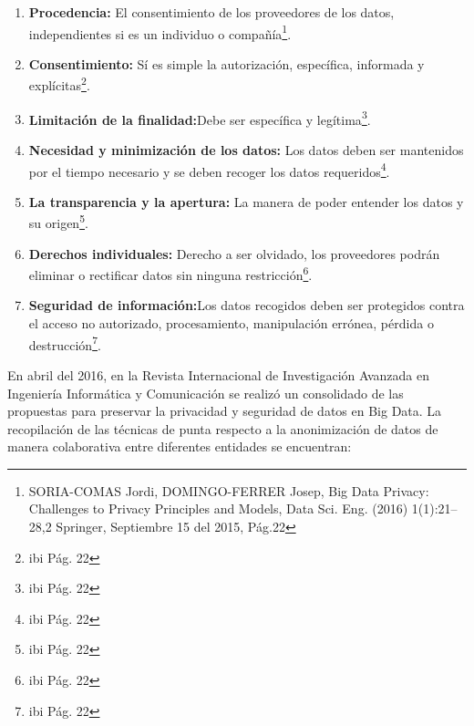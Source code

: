 \documentclass[a4paper,openright,12pt]{book}
\theoremstyle{definition}
\theoremstyle{remark}
\begin{document}
\begin{enumerate}
	\item \textbf{Procedencia:} El consentimiento de los proveedores de los datos, independientes si es un individuo o compañía\footnote{SORIA-COMAS Jordi, DOMINGO-FERRER Josep, 
Big Data Privacy: Challenges to Privacy Principles and Models, Data Sci. Eng. (2016) 1(1):21–28,2 Springer, Septiembre 15 del 2015, Pág.22}.
    \item \textbf{Consentimiento:} Sí es simple la autorización, específica, informada y explícitas\footnote{ibi Pág. 22}.
    \item \textbf{Limitación de la finalidad:}Debe ser específica y legítima\footnote{ibi Pág. 22}.
    \item \textbf{Necesidad y minimización de los datos:} Los datos deben ser mantenidos por el tiempo necesario y se deben recoger los datos requeridos\footnote{ibi Pág. 22}.
    \item \textbf{La transparencia y la apertura:} La manera de poder entender los datos y su origen\footnote{ibi Pág. 22}.
    \item \textbf{Derechos individuales:} Derecho a ser olvidado, los proveedores podrán eliminar o rectificar datos sin ninguna restricción\footnote{ibi Pág. 22}.
    \item \textbf{Seguridad de información:}Los datos recogidos deben ser protegidos contra el acceso no autorizado, procesamiento, manipulación errónea, pérdida o destrucción\footnote{ibi Pág. 22}.
\end{enumerate}
En abril del 2016, en la Revista Internacional de Investigación Avanzada en Ingeniería Informática y Comunicación se realizó un consolidado de las propuestas para preservar la privacidad y seguridad de datos en Big Data. La recopilación de las técnicas de punta respecto a la anonimización de datos de manera colaborativa entre diferentes entidades se encuentran:
\end{document}
